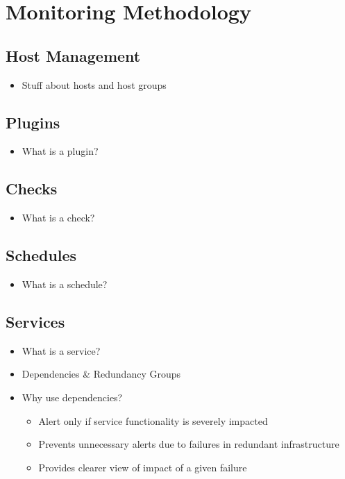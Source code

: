 \documentclass[bsc,logo,twoside]{infthesis}
\begin{document}
\section{Monitoring Methodology}
\subsection{Host Management}
\begin{itemize}
	\item Stuff about hosts and host groups
\end{itemize}

\subsection{Plugins}
\begin{itemize}
	\item What is a plugin?
\end{itemize}

\subsection{Checks}
\begin{itemize}
	\item What is a check?
\end{itemize}

\subsection{Schedules}
\begin{itemize}
	\item What is a schedule?
\end{itemize}

\subsection{Services}
\begin{itemize}
	\item What is a service?
	\item Dependencies \& Redundancy Groups
	\item Why use dependencies?
	\begin{itemize}
		\item Alert only if service functionality is severely impacted
		\item Prevents unnecessary alerts due to failures in redundant infrastructure
		\item Provides clearer view of impact of a given failure
	\end{itemize}
\end{itemize}
\end{document}
